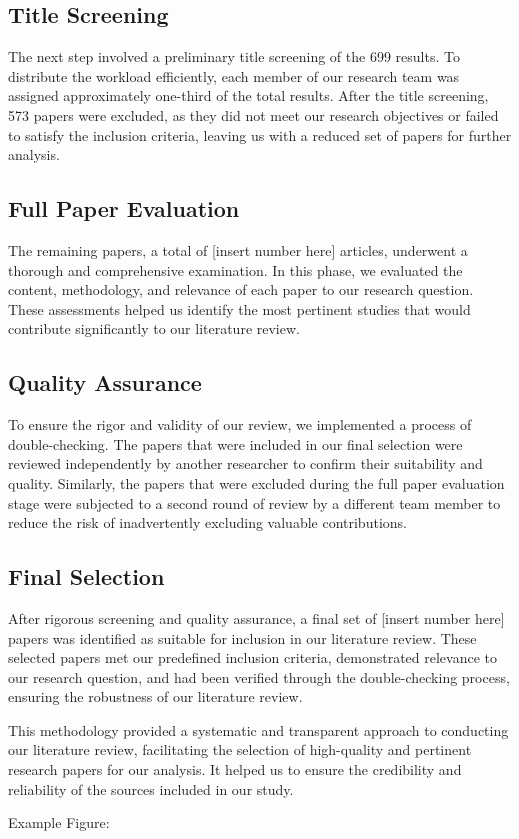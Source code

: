 \subsection{Title Screening}
The next step involved a preliminary title screening of the 699 results. To distribute the workload efficiently, each member of our research team was assigned approximately one-third of the total results. After the title screening, 573 papers were excluded, as they did not meet our research objectives or failed to satisfy the inclusion criteria, leaving us with a reduced set of papers for further analysis.


\subsection{Full Paper Evaluation}
The remaining papers, a total of [insert number here] articles, underwent a thorough and comprehensive examination. In this phase, we evaluated the content, methodology, and relevance of each paper to our research question. These assessments helped us identify the most pertinent studies that would contribute significantly to our literature review.

\subsection{Quality Assurance}
To ensure the rigor and validity of our review, we implemented a process of double-checking. The papers that were included in our final selection were reviewed independently by another researcher to confirm their suitability and quality. Similarly, the papers that were excluded during the full paper evaluation stage were subjected to a second round of review by a different team member to reduce the risk of inadvertently excluding valuable contributions.

\subsection{Final Selection}
After rigorous screening and quality assurance, a final set of [insert number here] papers was identified as suitable for inclusion in our literature review. These selected papers met our predefined inclusion criteria, demonstrated relevance to our research question, and had been verified through the double-checking process, ensuring the robustness of our literature review.

This methodology provided a systematic and transparent approach to conducting our literature review, facilitating the selection of high-quality and pertinent research papers for our analysis. It helped us to ensure the credibility and reliability of the sources included in our study.








Example Figure:


